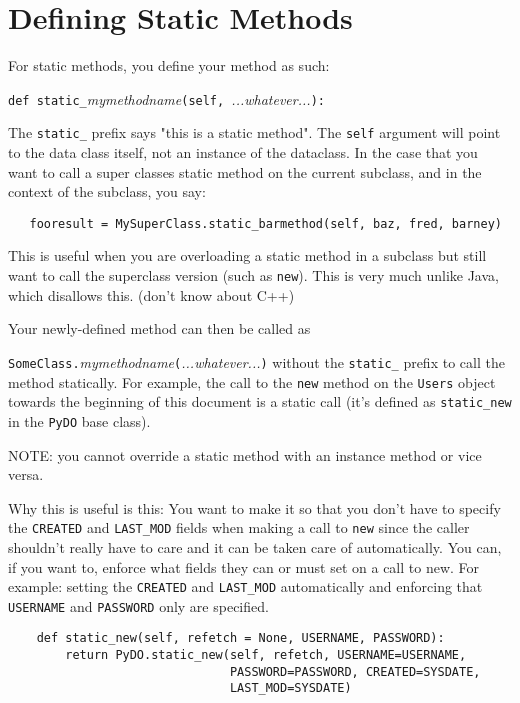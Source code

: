 \documentclass[titlepage]{manual}
\begin{document}
\section{Defining Static Methods}

For static methods, you define your method as such:

\noindent
\texttt{def static_}\emph{mymethodname}\texttt{(self, }\emph{...whatever...}\texttt{):}

The \texttt{static_} prefix says "this is a static method".  The
\texttt{self} argument will point to the data class itself, not an
instance of the dataclass.  In the case that you want to call a super
classes static method on the current subclass, and in the context of
the subclass, you say:

\begin{verbatim}
   fooresult = MySuperClass.static_barmethod(self, baz, fred, barney)
\end{verbatim}

This is useful when you are overloading a static method in a subclass
but still want to call the superclass version (such as \texttt{new}).
This is very much unlike Java, which disallows this.  (don't know
about C++)

Your newly-defined method can then be called as

\noindent
\texttt{SomeClass.}\emph{mymethodname}\texttt{(}\emph{...whatever...}\texttt{)}
without the \texttt{static_} prefix to call the method statically.
For example, the call to the \texttt{new} method on the \texttt{Users}
object towards the beginning of this document is a static call (it's
defined as \texttt{static_new} in the \texttt{PyDO} base class).

NOTE: you cannot override a static method with an instance method or
vice versa.

Why this is useful is this: You want to make it so that you don't have
to specify the \texttt{CREATED} and \texttt{LAST_MOD} fields when
making a call to \texttt{new} since the caller shouldn't really have
to care and it can be taken care of automatically.  You can, if you
want to, enforce what fields they can or must set on a call to new.
For example: setting the \texttt{CREATED} and \texttt{LAST_MOD}
automatically and enforcing that \texttt{USERNAME} and
\texttt{PASSWORD} only are specified.

\begin{verbatim}
    def static_new(self, refetch = None, USERNAME, PASSWORD):
        return PyDO.static_new(self, refetch, USERNAME=USERNAME, 
                               PASSWORD=PASSWORD, CREATED=SYSDATE, 
                               LAST_MOD=SYSDATE)
\end{verbatim}
       
\end{document}
